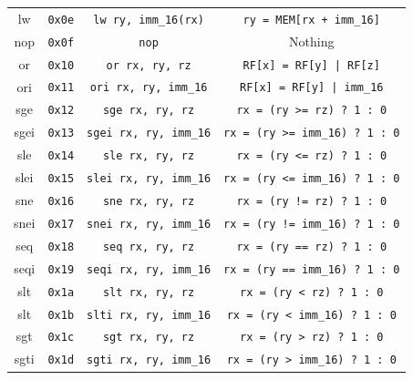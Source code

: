\begin{table}[]
\begin{tabular}{|c|c|c|c|}
lw & \texttt{0x0e} & \texttt{lw ry, imm\_16(rx)} &\texttt{ry = MEM[rx + imm\_16]} \\

nop & \texttt{0x0f} & \texttt{nop} & Nothing \\

or & \texttt{0x10} & \texttt{or rx, ry, rz} & \texttt{RF[x] = RF[y] | RF[z]} \\

ori & \texttt{0x11} & \texttt{ori rx, ry, imm\_16} & \texttt{RF[x] = RF[y] | imm\_16} \\

sge & \texttt{0x12} & \texttt{sge rx, ry, rz} & \texttt{rx = (ry >= rz) ? 1 : 0} \\

sgei & \texttt{0x13} & \texttt{sgei rx, ry, imm\_16} & \texttt{rx = (ry >= imm\_16) ? 1 : 0} \\

sle & \texttt{0x14} & \texttt{sle rx, ry, rz} & \texttt{rx = (ry <= rz) ? 1 : 0} \\

slei & \texttt{0x15} & \texttt{slei rx, ry, imm\_16} & \texttt{rx = (ry <= imm\_16) ? 1 : 0} \\

sne & \texttt{0x16} & \texttt{sne rx, ry, rz} & \texttt{rx = (ry != rz) ? 1 : 0} \\

snei & \texttt{0x17} & \texttt{snei rx, ry, imm\_16} & \texttt{rx = (ry != imm\_16) ? 1 : 0} \\

seq & \texttt{0x18} & \texttt{seq rx, ry, rz} & \texttt{rx = (ry == rz) ? 1 : 0} \\

seqi & \texttt{0x19} & \texttt{seqi rx, ry, imm\_16} & \texttt{rx = (ry == imm\_16) ? 1 : 0} \\

slt & \texttt{0x1a} & \texttt{slt rx, ry, rz} & \texttt{rx = (ry < rz) ? 1 : 0} \\

slt & \texttt{0x1b} & \texttt{slti rx, ry, imm\_16} & \texttt{rx = (ry < imm\_16) ? 1 : 0} \\

sgt & \texttt{0x1c} & \texttt{sgt rx, ry, rz} & \texttt{rx = (ry > rz) ? 1 : 0} \\

sgti & \texttt{0x1d} & \texttt{sgti rx, ry, imm\_16} & \texttt{rx = (ry > imm\_16) ? 1 : 0} \\


\end{tabular}
\end{table}
